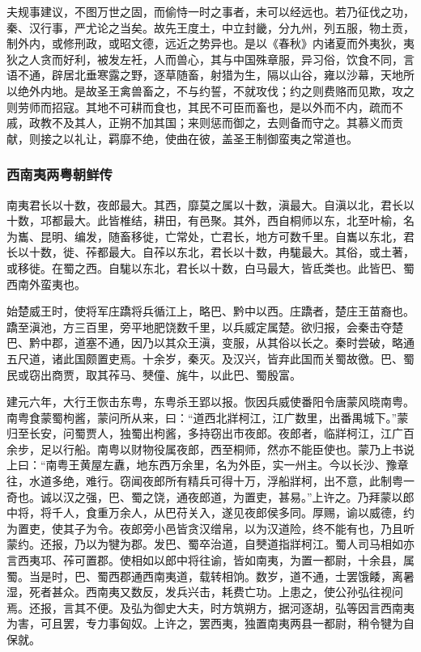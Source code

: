 \documentclass[]{article}
\begin{document}
夫规事建议，不图万世之固，而偷恃一时之事者，未可以经远也。若乃征伐之功，秦、汉行事，严尤论之当矣。故先王度土，中立封畿，分九州，列五服，物土贡，制外内，或修刑政，或昭文德，远近之势异也。是以《春秋》内诸夏而外夷狄，夷狄之人贪而好利，被发左衽，人而兽心，其与中国殊章服，异习俗，饮食不同，言语不通，辟居北垂寒露之野，逐草随畜，射猎为生，隔以山谷，雍以沙幕，天地所以绝外内地。是故圣王禽兽畜之，不与约誓，不就攻伐；约之则费赂而见欺，攻之则劳师而招寇。其地不可耕而食也，其民不可臣而畜也，是以外而不内，疏而不戚，政教不及其人，正朔不加其国；来则惩而御之，去则备而守之。其慕义而贡献，则接之以礼让，羁靡不绝，使曲在彼，盖圣王制御蛮夷之常道也。

\hypertarget{header-n6317}{%
\subsubsection{西南夷两粤朝鲜传}\label{header-n6317}}

南夷君长以十数，夜郎最大。其西，靡莫之属以十数，滇最大。自滇以北，君长以十数，邛都最大。此皆椎结，耕田，有邑聚。其外，西自桐师以东，北至叶榆，名为巂、昆明、编发，随畜移徙，亡常处，亡君长，地方可数千里。自巂以东北，君长以十数，徙、莋都最大。自莋以东北，君长以十数，冉駹最大。其俗，或土著，或移徙。在蜀之西。自駹以东北，君长以十数，白马最大，皆氐类也。此皆巴、蜀西南外蛮夷也。

始楚威王时，使将军庄蹻将兵循江上，略巴、黔中以西。庄蹻者，楚庄王苗裔也。蹻至滇池，方三百里，旁平地肥饶数千里，以兵威定属楚。欲归报，会秦击夺楚巴、黔中郡，道塞不通，因乃以其众王滇，变服，从其俗以长之。秦时尝破，略通五尺道，诸此国颇置吏焉。十余岁，秦灭。及汉兴，皆弃此国而关蜀故徼。巴、蜀民或窃出商贾，取其莋马、僰僮、旄牛，以此巴、蜀殷富。

建元六年，大行王恢击东粤，东粤杀王郢以报。恢因兵威使番阳令唐蒙风晓南粤。南粤食蒙蜀枸酱，蒙问所从来，曰：``道西北牂柯江，江广数里，出番禺城下。''蒙归至长安，问蜀贾人，独蜀出枸酱，多持窃出市夜郎。夜郎者，临牂柯江，江广百余步，足以行船。南粤以财物役属夜郎，西至桐师，然亦不能臣使也。蒙乃上书说上曰：``南粤王黄屋左纛，地东西万余里，名为外臣，实一州主。今以长沙、豫章往，水道多绝，难行。窃闻夜郎所有精兵可得十万，浮船牂柯，出不意，此制粤一奇也。诚以汉之强，巴、蜀之饶，通夜郎道，为置吏，甚易。''上许之。乃拜蒙以郎中将，将千人，食重万余人，从巴苻关入，遂见夜郎侯多同。厚赐，谕以威德，约为置吏，使其子为令。夜郎旁小邑皆贪汉缯帛，以为汉道险，终不能有也，乃且听蒙约。还报，乃以为犍为郡。发巴、蜀卒治道，自僰道指牂柯江。蜀人司马相如亦言西夷邛、莋可置郡。使相如以郎中将往谕，皆如南夷，为置一都尉，十余县，属蜀。当是时，巴、蜀西郡通西南夷道，载转相饷。数岁，道不通，士罢饿餧，离暑湿，死者甚众。西南夷又数反，发兵兴击，耗费亡功。上患之，使公孙弘往视问焉。还报，言其不便。及弘为御史大夫，时方筑朔方，据河逐胡，弘等因言西南夷为害，可且罢，专力事匈奴。上许之，罢西夷，独置南夷两县一都尉，稍令犍为自保就。
\end{document}
